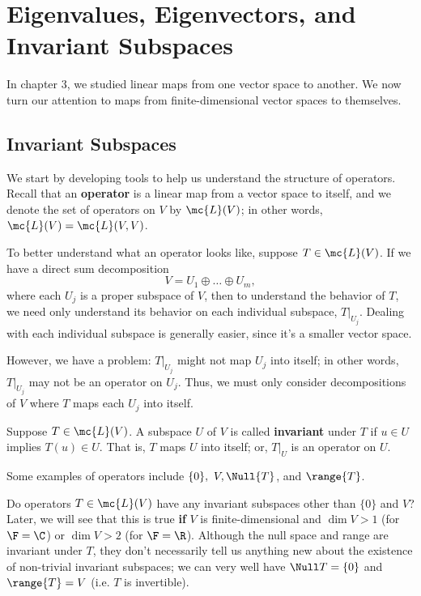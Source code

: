 \documentclass[math0540-lecture-notes.tex]{subfiles}
\begin{document}
\chapter{Eigenvalues, Eigenvectors, and Invariant Subspaces}

In chapter 3, we studied linear maps from one vector space to another. We now turn our attention to
maps from finite-dimensional vector spaces to themselves.

\section{Invariant Subspaces}

We start by developing tools to help us understand the structure of operators. Recall that an
\textbf{operator} is a linear map from a vector space to itself, and we denote the set of operators
on $V$ by $\mc{L}(V)$; in other words, $\mc{L}(V)=\mc{L}(V,V)$.

To better understand what an operator looks like, suppose $T\in \mc{L}(V)$. If we have a direct sum
decomposition \[
  V = U_1\oplus \ldots\oplus U_m
,\] where each $U_j$ is a proper subspace of $V$, then to understand the behavior of $T$, we need
only understand its behavior on each individual subspace, $T|_{U_j}$. Dealing with each individual
subspace is generally easier, since it's a smaller vector space.

However, we have a problem: $T|_{U_j}$ might not map $U_j$ into itself; in other words, $T|_{U_j}$
may not be an operator on $U_j$. Thus, we must only consider decompositions of $V$ where $T$ maps
each $U_j$ into itself.

\begin{definition}{}
  Suppose $T\in \mc{L}(V)$. A subspace $U$ of $V$ is called \textbf{invariant} under $T$ if $u\in U$
  implies $T(u)\in U$. That is, $T$ maps $U$ into itself; or, $T|_{U}$ is an operator on $U$.
\end{definition}

Some examples of operators include $\{ 0 \},\ V, \Null{T}$, and $\range{T}$. 

Do operators $T\in \mc{L}(V)$ have any invariant subspaces other than $\{ 0 \}$ and $V$? Later, we
will see that this is true \textbf{if} $V$ is finite-dimensional and $\dim V >1$ (for $\F=\C$) or
$\dim V > 2$ (for $\F=\R$). Although the null space and range are invariant under $T$, they don't
necessarily tell us anything new about the existence of non-trivial invariant subspaces; we can very
well have $\Null T=\{ 0 \}$ and $\range{T}=V$ (i.e. $T$ is invertible).
\end{document}

